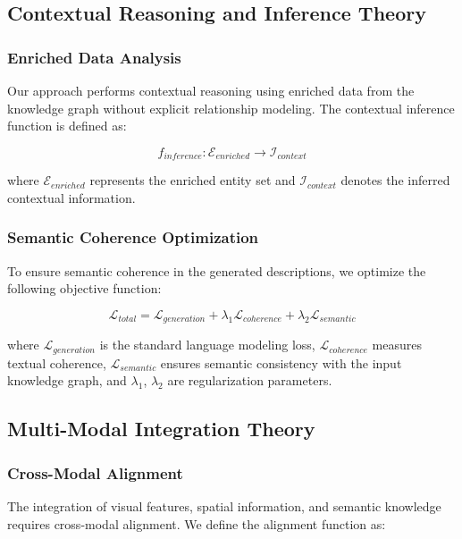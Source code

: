 \documentclass[runningheads,14pt]{llncs}
\begin{document}
\subsection{Contextual Reasoning and Inference Theory}

\subsubsection{Enriched Data Analysis}
Our approach performs contextual reasoning using enriched data from the knowledge graph without explicit relationship modeling. The contextual inference function is defined as:

\begin{equation}
f_{inference}: \mathcal{E}_{enriched} \rightarrow \mathcal{I}_{context}
\end{equation}

where $\mathcal{E}_{enriched}$ represents the enriched entity set and $\mathcal{I}_{context}$ denotes the inferred contextual information.

\subsubsection{Semantic Coherence Optimization}
To ensure semantic coherence in the generated descriptions, we optimize the following objective function:

\begin{equation}
\mathcal{L}_{total} = \mathcal{L}_{generation} + \lambda_1 \mathcal{L}_{coherence} + \lambda_2 \mathcal{L}_{semantic}
\end{equation}

where $\mathcal{L}_{generation}$ is the standard language modeling loss, $\mathcal{L}_{coherence}$ measures textual coherence, $\mathcal{L}_{semantic}$ ensures semantic consistency with the input knowledge graph, and $\lambda_1$, $\lambda_2$ are regularization parameters.

\subsection{Multi-Modal Integration Theory}

\subsubsection{Cross-Modal Alignment}
The integration of visual features, spatial information, and semantic knowledge requires cross-modal alignment. We define the alignment function as:
\end{document}
